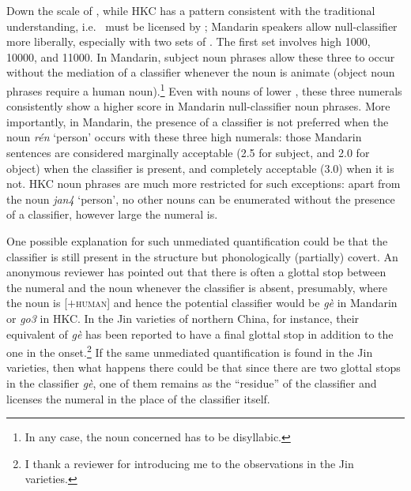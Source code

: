 \documentclass[output=paper]{langsci/langscibook}
\begin{document}
Down the scale of , while \gls{HKC} has a
pattern consistent with the traditional understanding, i.e.\ 
must be licensed by ; Mandarin speakers allow null-classifier
 more liberally, especially with two sets of .
The first set involves high  1000, 10000, and 11000. In
Mandarin, subject noun phrases allow these three  to
occur without the mediation of a classifier whenever the noun
is animate (object noun phrases require a human noun).\footnote{In any case,
the noun concerned has to be disyllabic.} Even with nouns of lower
, these three numerals consistently show a higher score in
Mandarin null-classifier noun phrases. More importantly, in
Mandarin, the presence of a classifier is not
preferred when the noun \emph{rén} ‘person’ occurs with these three high
numerals: those Mandarin sentences are considered marginally
acceptable (2.5 for subject, and 2.0 for object) when the
classifier is present, and completely acceptable (3.0) when it
is not. \gls{HKC} noun phrases are much more restricted
for such exceptions: apart from the noun \emph{jan4} ‘person’, no other nouns
can be enumerated without the presence of a classifier, however large the
numeral is.

One possible explanation for such unmediated quantification could be that the
classifier is still present in the structure but phonologically
(partially) covert. An anonymous reviewer has pointed out that there is often a
glottal stop between the numeral and the noun whenever the
classifier is absent, presumably, where the noun is [$+$\textsc{human}] and hence
the potential classifier would be \emph{gè} in
Mandarin or \emph{go3} in \gls{HKC}. In the Jin varieties of
northern China, for instance, their equivalent of \emph{gè} has been reported
to have a final glottal stop in addition to the one in the onset.\footnote{I
    thank a reviewer for introducing me to the observations in the Jin
varieties.} If the same unmediated quantification is found in the Jin
varieties, then what happens there could be that since there are two glottal
stops in the classifier \emph{gè}, one of them remains as the
\enquote{residue} of the classifier and licenses the numeral in the place of
the classifier itself.
\end{document}
